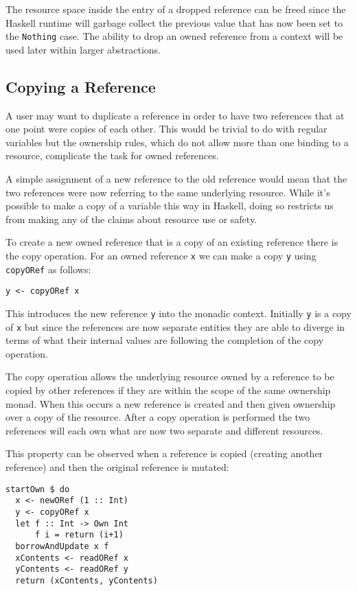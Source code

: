 \documentclass[onehalf,11pt]{beavtex}
\begin{document}
The resource space inside the entry of a dropped reference can be freed since
the Haskell runtime will garbage collect the previous value that has now been
set to the \texttt{Nothing} case.
The ability to drop an owned reference from a context will be used later
within larger abstractions.


\subsection{Copying a Reference}

A user may want to duplicate a reference in order to have two references
that at one point were copies of each other.
This would be trivial to do with regular variables but the ownership rules,
which do not allow more than one binding to a resource, complicate the task for
owned references.

A simple assignment of a new reference to the old reference would mean that
the two references were now referring to the same underlying resource.
While it's possible to make a copy of a variable this way in Haskell,
doing so restricts us from making any of the claims about resource use
or safety.

To create a new owned reference that is a copy of an existing reference
there is the copy operation. For an owned reference \texttt{x} we can make
a copy \texttt{y} using \texttt{copyORef} as follows:

\begin{verbatim}
y <- copyORef x
\end{verbatim}

This introduces the new reference \texttt{y} into the monadic context. Initially
\texttt{y} is a copy of \texttt{x} but since the references are now separate
entities they are able to diverge in terms of what their internal
values are following the completion of the copy operation.

The copy operation allows the underlying resource owned by a reference to be
copied by other references if they are within the scope of the same ownership
monad.
When this occurs a new reference is created and then given ownership over a
copy of the resource.
After a copy operation is performed the two references will each own what are
now two separate and different resources.

This property can be observed when a reference is copied (creating another
reference) and then the original reference is mutated:

\begin{lstlisting}
startOwn $ do
  x <- newORef (1 :: Int)
  y <- copyORef x
  let f :: Int -> Own Int
      f i = return (i+1)
  borrowAndUpdate x f
  xContents <- readORef x
  yContents <- readORef y
  return (xContents, yContents)
\end{lstlisting}
\end{document}
